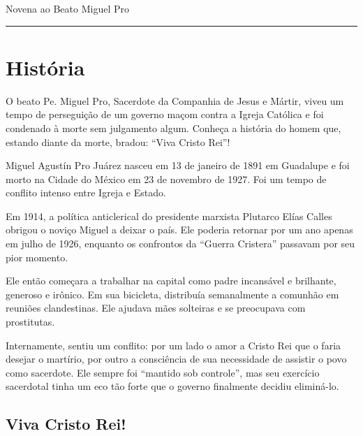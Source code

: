 \documentclass[a4paper,14pt,twoside]{extarticle} \usepackage[utf8]{inputenc}
\begin{document}
\begin{center}
  {\huge Novena ao Beato Miguel Pro}
\end{center}




\begin{center}
  \rule{1.0\textwidth}{0.4pt}
\end{center}

\tableofcontents
\thispagestyle{empty}


\newpage
\section{História}

O beato Pe. Miguel Pro, Sacerdote da Companhia de Jesus e Mártir, viveu um tempo de perseguição de um governo maçom contra a Igreja Católica e foi condenado à morte sem julgamento algum. Conheça a história do homem que, estando diante da morte, bradou: “Viva Cristo Rei”!

Miguel Agustín Pro Juárez nasceu em 13 de janeiro de 1891 em Guadalupe e foi morto na Cidade do México em 23 de novembro de 1927. Foi um tempo de conflito intenso entre Igreja e Estado.

Em 1914, a política anticlerical do presidente marxista Plutarco Elías Calles obrigou o noviço Miguel a deixar o país. Ele poderia retornar por um ano apenas em julho de 1926, enquanto os confrontos da “Guerra Cristera” passavam por seu pior momento.

Ele então começara a trabalhar na capital como padre incansável e brilhante, generoso e irônico. Em sua bicicleta, distribuía semanalmente a comunhão em reuniões clandestinas. Ele ajudava mães solteiras e se preocupava com prostitutas.

Internamente, sentiu um conflito: por um lado o amor a Cristo Rei que o faria desejar o martírio, por outro a consciência de sua necessidade de assistir o povo como sacerdote. Ele sempre foi “mantido sob controle”, mas seu exercício sacerdotal tinha um eco tão forte que o governo finalmente decidiu eliminá-lo.

\subsection{Viva Cristo Rei!}
\end{document}
